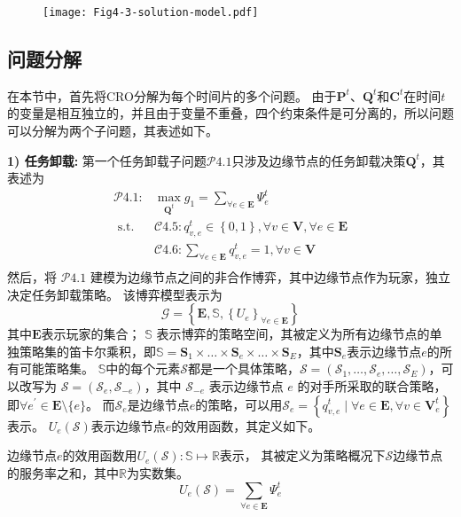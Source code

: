 \begin{figure}[h]
\centering
  \texttt{[image: Fig4-3-solution-model.pdf]}
  \label{fig 4-3}
\end{figure} 

\subsection{问题分解}
在本节中，首先将CRO分解为每个时间片的多个问题。
由于$\mathbf{P}^{t}$、$\mathbf{Q}^{t}$和$\mathbf{C}^{t}$在时间$t$的变量是相互独立的，并且由于变量不重叠，四个约束条件是可分离的，所以问题可以分解为两个子问题，其表述如下。

\textbf{1) 任务卸载:} 第一个任务卸载子问题$\mathcal{P}4.1$只涉及边缘节点的任务卸载决策$\mathbf{Q}^{t}$，其表述为
\begin{equation}
	\begin{aligned}
		\mathcal{P}4.1: &\max_{\mathbf{Q}^{t}} g_1= \sum_{ \forall e \in \mathbf{E}} \Psi_{e}^{t}  \\
		\text { s.t. }  
		&\mathcal{C}4.5: q_{v, e}^t \in \left \{0, 1\right \}, \forall v \in \mathbf{V}, \forall e \in \mathbf{E}  \\
        &\mathcal{C}4.6: \sum_{\forall e \in \mathbf{E}} q_{v, e}^t = 1, \forall v \in \mathbf{V} \\
	\end{aligned}
\end{equation}
然后，将 $\mathcal{P}4.1$ 建模为边缘节点之间的非合作博弈，其中边缘节点作为玩家，独立决定任务卸载策略。
该博弈模型表示为
\begin{equation}
	\mathcal{G} = \left\{\mathbf{E}, \mathbb{S}, \left\{{U}_{e}\right\}_{\forall e \in \mathbf{E}} \right\}
\end{equation}
其中$\mathbf{E}$表示玩家的集合；
$\mathbb{S}$ 表示博弈的策略空间，其被定义为所有边缘节点的单独策略集的笛卡尔乘积，即$\mathbb{S} = \mathbf{S}_{1} \times \ldots \times \mathbf{S}_{e} \times \ldots \times \mathbf{S}_{E}$，其中$\mathbf{S}_{e}$表示边缘节点$e$的所有可能策略集。
$\mathbb{S}$中的每个元素$\mathcal{S}$都是一个具体策略，$\mathcal{S} = \left(\mathcal{S}_{1}, \ldots, \mathcal{S}_{e}, \ldots, \mathcal{S}_{E} \right)$，可以改写为 $\mathcal{S}=\left( \mathcal{S}_{e}, \mathcal{S}_{-e}\right)$，其中 $\mathcal{S}_{-e}$ 表示边缘节点 $e$ 的对手所采取的联合策略，即$\forall e^{\prime} \in \mathbf{E} \setminus \{e\}$。
而$\mathcal{S}_{e}$是边缘节点$e$的策略，可以用$\mathcal{S}_{e} = \left\{ q_{v, e}^t \mid \forall e \in \mathbf{E}, \forall v \in \mathbf{V}_{e}^{t} \right\}$表示。
${U}_{e}\left(\mathcal{S}\right)$表示边缘节点$e$的效用函数，其定义如下。
\begin{definition}
边缘节点$e$的效用函数用${U}_{e}\left(\mathcal{S}\right): \mathbb{S} \mapsto \mathbb{R}$表示， 其被定义为策略概况下$\mathcal{S}$边缘节点的服务率之和，其中$\mathbb{R}$为实数集。
	\begin{equation}
		{U}_{e}\left(\mathcal{S}\right) = \sum_{\forall e \in \mathbf{E}} \Psi_{e}^{t}
	\end{equation}
\end{definition}

